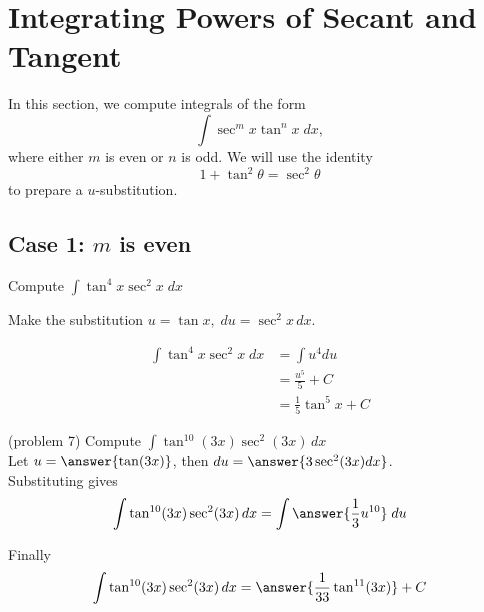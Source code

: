 \documentclass[handout]{ximera}
\begin{document}



\section{Integrating Powers of Secant and Tangent}
In this section, we compute integrals of the form
\[
\int \sec^m x\tan^n x \; dx,
\]
where either $m$ is even or $n$ is odd. We will use the identity
\[
1+\tan^2 \theta = \sec^2 \theta
\]
to prepare a $u$-substitution.


\subsection{Case 1: $m$ is even}
\begin{example}[example 7]
Compute $\displaystyle{\int \tan^4 x \sec^2 x\;dx}$

Make the substitution $u = \tan x, \; du = \sec^2 x \, dx$.

\begin{align*}
\int \tan^4 x \sec^2 x\;dx &= \int u^4 du\\
&=  \frac{u^5}{5} + C  \\
&= \frac15\tan^5 x  + C
\end{align*}
\end{example} 




\begin{problem}(problem 7)
Compute $\displaystyle{\int \tan^{10}(3x)\sec^2(3x) \, dx}$\\

Let $u = \answer{\tan(3x)}$, \; then $du = \answer{3\sec^2(3x) dx}$.\\

Substituting gives 
\[
\int \tan^{10}(3x)\sec^2(3x) \, dx = \int \answer{\frac13 u^{10}} \; du
\]

Finally
\[
\int \tan^{10}(3x)\sec^2(3x) \, dx = \answer{\frac{1}{33} \tan^{11}(3x)} + C
\]

\end{problem}
\end{document}
